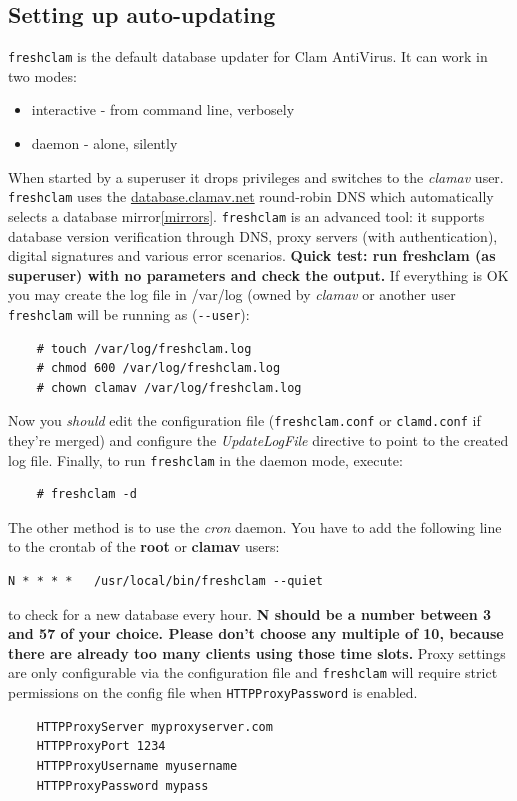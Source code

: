 \documentclass[a4paper,titlepage,12pt]{article}
\begin{document}
    \subsection{Setting up auto-updating}
    \verb+freshclam+ is the default database updater for Clam AntiVirus.
    It can work in two modes:
    \begin{itemize}
	\item interactive - from command line, verbosely
	\item daemon - alone, silently
    \end{itemize}
    When started by a superuser it drops privileges and switches
    to the \emph{clamav} user. \verb+freshclam+ uses the
    \url{database.clamav.net} round-robin DNS which automatically selects
    a database mirror\ref{mirrors}. \verb+freshclam+ is an advanced tool:
    it supports database version verification through DNS, proxy servers (with
    authentication), digital signatures and various error scenarios.
    \textbf{Quick test: run freshclam (as superuser) with no parameters
    and check the output.} If everything is OK you may create the log file in
    /var/log (owned by \emph{clamav} or another user \verb+freshclam+ will be
    running as (\verb+--user+):
    \begin{verbatim}
	# touch /var/log/freshclam.log
	# chmod 600 /var/log/freshclam.log
	# chown clamav /var/log/freshclam.log
    \end{verbatim}
    Now you \emph{should} edit the configuration file (\verb+freshclam.conf+ or
    \verb+clamd.conf+ if they're merged) and configure the
    \emph{UpdateLogFile} directive to point to the created log file.
    Finally, to run \verb+freshclam+ in the daemon mode, execute:
    \begin{verbatim}
	# freshclam -d
    \end{verbatim}
    The other method is to use the \emph{cron} daemon. You have to add the
    following line to the crontab of the \textbf{root} or \textbf{clamav} users:
    {\small
    \begin{verbatim}
N * * * *	/usr/local/bin/freshclam --quiet
    \end{verbatim}}
    \noindent to check for a new database every hour. \textbf{N should be a
    number between 3 and 57 of your choice. Please don't choose any multiple
    of 10, because there are already too many clients using those time slots.}
    Proxy settings are only configurable via the configuration file and
    \verb+freshclam+ will require strict permissions on the config file when
    \verb+HTTPProxyPassword+ is enabled.
    \begin{verbatim}
	HTTPProxyServer myproxyserver.com
	HTTPProxyPort 1234
	HTTPProxyUsername myusername
	HTTPProxyPassword mypass
    \end{verbatim}
\end{document}
